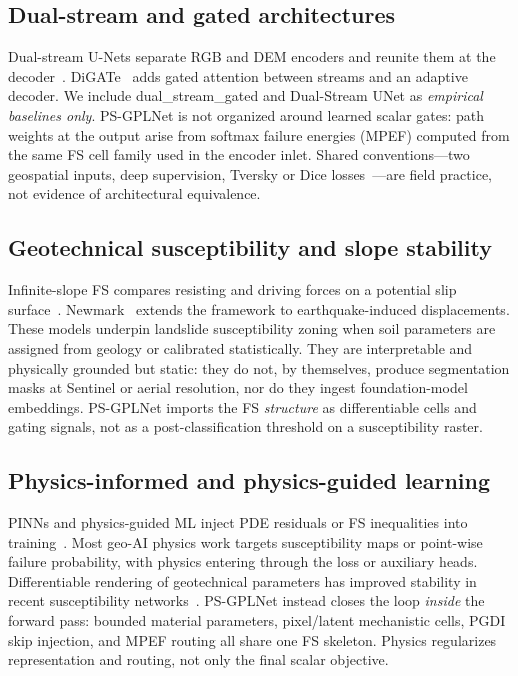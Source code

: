 \subsection{Dual-stream and gated architectures}
Dual-stream U-Nets separate RGB and DEM encoders and reunite them at the decoder~\cite{islam2024digate}. DiGATe~\cite{islam2024digate} adds gated attention between streams and an adaptive decoder. We include dual\_stream\_gated and Dual-Stream UNet as \emph{empirical baselines only}. PS-GPLNet is not organized around learned scalar gates: path weights at the output arise from softmax failure energies (MPEF) computed from the same FS cell family used in the encoder inlet. Shared conventions---two geospatial inputs, deep supervision, Tversky or Dice losses~\cite{salehi2017tversky,lin2017focal}---are field practice, not evidence of architectural equivalence.

\subsection{Geotechnical susceptibility and slope stability}
Infinite-slope FS compares resisting and driving forces on a potential slip surface~\cite{skempton1957stability}. Newmark~\cite{newmark1965effects} extends the framework to earthquake-induced displacements. These models underpin landslide susceptibility zoning when soil parameters are assigned from geology or calibrated statistically. They are interpretable and physically grounded but static: they do not, by themselves, produce segmentation masks at Sentinel or aerial resolution, nor do they ingest foundation-model embeddings. PS-GPLNet imports the FS \emph{structure} as differentiable cells and gating signals, not as a post-classification threshold on a susceptibility raster.

\subsection{Physics-informed and physics-guided learning}
PINNs and physics-guided ML inject PDE residuals or FS inequalities into training~\cite{karniadakis2021physics,dahal2024pinn,liu2023physics,maurya2024pgml,restrepo2022physics}. Most geo-AI physics work targets susceptibility maps or point-wise failure probability, with physics entering through the loss or auxiliary heads. Differentiable rendering of geotechnical parameters has improved stability in recent susceptibility networks~\cite{dahal2024pinn}. PS-GPLNet instead closes the loop \emph{inside} the forward pass: bounded material parameters, pixel/latent mechanistic cells, PGDI skip injection, and MPEF routing all share one FS skeleton. Physics regularizes representation and routing, not only the final scalar objective.

